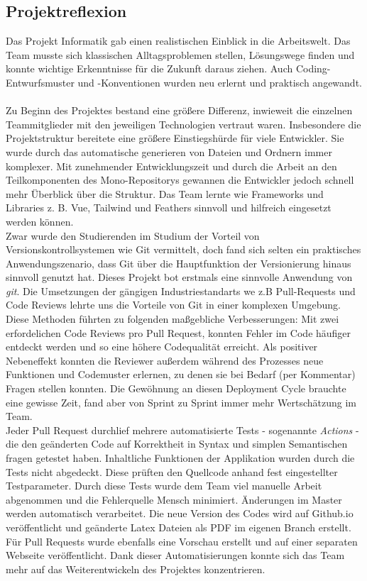 \documentclass[10pt, a4paper]{article}
\begin{document}
\begin{onehalfspace}
\subsection{Projektreflexion}
Das Projekt Informatik gab einen realistischen Einblick in die Arbeitswelt.
Das Team musste sich klassischen Alltagsproblemen stellen, Lösungswege finden und konnte wichtige Erkenntnisse für die Zukunft daraus ziehen.
Auch Coding-Entwurfsmuster und -Konventionen wurden neu erlernt und praktisch angewandt.
$~$ \\
Zu Beginn des Projektes bestand eine größere Differenz, inwieweit die einzelnen Teammitglieder mit den jeweiligen Technologien vertraut waren.
Insbesondere die Projektstruktur bereitete eine größere Einstiegshürde für viele Entwickler.
Sie wurde durch das automatische generieren von Dateien und Ordnern immer komplexer.
Mit zunehmender Entwicklungszeit und durch die Arbeit an den Teilkomponenten des Mono-Repositorys gewannen die Entwickler jedoch schnell mehr Überblick über die Struktur.
Das Team lernte wie Frameworks und Libraries  z. B. Vue, Tailwind und Feathers sinnvoll und hilfreich eingesetzt werden können.
$~$ \\
Zwar wurde den Studierenden im Studium der Vorteil von Versionskontrollsystemen wie Git vermittelt, doch fand sich selten ein praktisches Anwendungszenario, dass Git über die Hauptfunktion der Versionierung hinaus sinnvoll genutzt hat.
Dieses Projekt bot erstmals eine sinnvolle Anwendung von \textit{git}.
Die Umsetzungen der gängigen Industriestandarts we z.B Pull-Requests und Code Reviews lehrte uns die Vorteile von Git in einer komplexen Umgebung.
Diese Methoden führten zu folgenden maßgebliche Verbesserungen:
Mit zwei erfordelichen Code Reviews pro Pull Request, konnten Fehler im Code häufiger entdeckt werden und so eine höhere Codequalität erreicht.
Als positiver Nebeneffekt konnten die Reviewer außerdem während des Prozesses neue Funktionen und Codemuster erlernen, zu denen sie bei Bedarf (per Kommentar) Fragen stellen konnten.
Die Gewöhnung an diesen Deployment Cycle brauchte eine gewisse Zeit, fand aber von Sprint zu Sprint immer mehr Wertschätzung im Team.
$~$ \\
Jeder Pull Request durchlief mehrere automatisierte Tests - sogenannte \textit{Actions} - die den geänderten Code auf Korrektheit in Syntax und simplen Semantischen fragen getestet haben.
Inhaltliche Funktionen der Applikation wurden durch die Tests nicht abgedeckt.
Diese prüften den Quellcode anhand fest eingestellter Testparameter.
Durch diese Tests wurde dem Team viel manuelle Arbeit abgenommen und die Fehlerquelle Mensch minimiert.
Änderungen im Master werden automatisch verarbeitet. Die neue Version des Codes wird auf Github.io veröffentlicht und geänderte Latex Dateien als PDF im eigenen Branch erstellt.
Für Pull Requests wurde ebenfalls eine Vorschau erstellt und auf einer separaten Webseite veröffentlicht.
Dank dieser Automatisierungen konnte sich das Team mehr auf das Weiterentwickeln des Projektes konzentrieren.


\end{onehalfspace}
\end{document}
